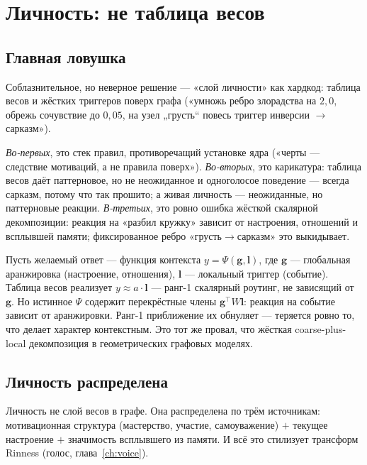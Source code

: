 \chapter{Личность: не таблица весов}
\label{ch:personality}

\section{Главная ловушка}

Соблазнительное, но неверное решение — «слой личности» как хардкод: таблица весов и
жёстких триггеров поверх графа («умножь ребро злорадства на $2{,}0$, обрежь сочувствие
до $0{,}05$, на узел „грусть“ повесь триггер инверсии $\to$ сарказм»).

\begin{pitfall}
\emph{Во-первых}, это стек правил, противоречащий установке ядра («черты — следствие
мотиваций, а не правила поверх»). \emph{Во-вторых}, это карикатура: таблица весов
даёт паттерновое, но не неожиданное и одноголосое поведение — всегда сарказм, потому
что так прошито; а живая личность — неожиданные, но паттерновые реакции.
\emph{В-третьих}, это ровно ошибка жёсткой скалярной декомпозиции: реакция на
«разбил кружку» зависит от настроения, отношений и всплывшей памяти; фиксированное
ребро «грусть$\to$сарказм» это выкидывает.
\end{pitfall}

\begin{workedbox}
Пусть желаемый ответ — функция контекста $y=\Psi(\mathbf{g},\mathbf{l})$, где
$\mathbf{g}$ — глобальная аранжировка (настроение, отношения), $\mathbf{l}$ —
локальный триггер (событие). Таблица весов реализует $y\approx a\cdot\mathbf{l}$ —
ранг-1 скалярный роутинг, не зависящий от $\mathbf{g}$. Но истинное $\Psi$ содержит
перекрёстные члены $\mathbf{g}^\top W \mathbf{l}$: реакция на событие зависит от
аранжировки. Ранг-1 приближение их обнуляет — теряется ровно то, что делает характер
контекстным. Это тот же провал, что жёсткая coarse-plus-local декомпозиция в
геометрических графовых моделях.
\end{workedbox}

\section{Личность распределена}

Личность не слой весов в графе. Она распределена по трём источникам: мотивационная
структура (мастерство, участие, самоуважение) $+$ текущее настроение $+$ значимость
всплывшего из памяти. И всё это стилизует трансформ Rinness (голос,
глава~\ref{ch:voice}).

